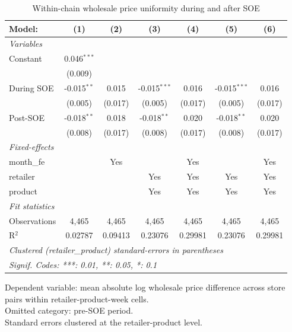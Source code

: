 
\begin{table}[htbp]
   \caption{\label{tab:uniformity_wholesale} Within-chain wholesale price uniformity during and after SOE}
   \centering
   \begin{tabular}{lcccccc}
      \tabularnewline \midrule \midrule
      Model:       & (1)           & (2)     & (3)            & (4)     & (5)            & (6)\\  
      \midrule
      \emph{Variables}\\
      Constant     & 0.046$^{***}$ &         &                &         &                &   \\   
                   & (0.009)       &         &                &         &                &   \\   
      During SOE   & -0.015$^{**}$ & 0.015   & -0.015$^{***}$ & 0.016   & -0.015$^{***}$ & 0.016\\   
                   & (0.005)       & (0.017) & (0.005)        & (0.017) & (0.005)        & (0.017)\\   
      Post-SOE     & -0.018$^{**}$ & 0.018   & -0.018$^{**}$  & 0.020   & -0.018$^{**}$  & 0.020\\   
                   & (0.008)       & (0.017) & (0.008)        & (0.017) & (0.008)        & (0.017)\\   
      \midrule
      \emph{Fixed-effects}\\
      month\_fe    &               & Yes     &                & Yes     &                & Yes\\  
      retailer     &               &         & Yes            & Yes     & Yes            & Yes\\  
      product      &               &         & Yes            & Yes     & Yes            & Yes\\  
      \midrule
      \emph{Fit statistics}\\
      Observations & 4,465         & 4,465   & 4,465          & 4,465   & 4,465          & 4,465\\  
      R$^2$        & 0.02787       & 0.09413 & 0.23076        & 0.29981 & 0.23076        & 0.29981\\  
      \midrule \midrule
      \multicolumn{7}{l}{\emph{Clustered (retailer\_product) standard-errors in parentheses}}\\
      \multicolumn{7}{l}{\emph{Signif. Codes: ***: 0.01, **: 0.05, *: 0.1}}\\
   \end{tabular}
   
   \par \raggedright 
   Dependent variable: mean absolute log wholesale price difference across store pairs within retailer-product-week cells.\\
   Omitted category: pre-SOE period.\\
   Standard errors clustered at the retailer-product level.
\end{table}


